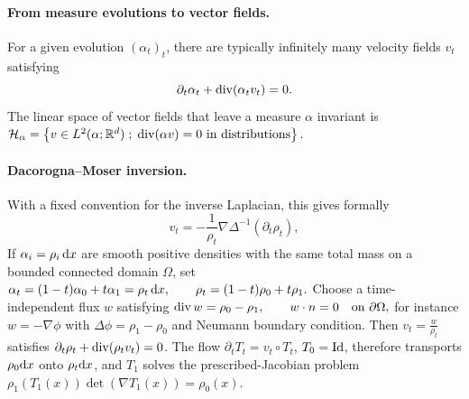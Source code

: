 \paragraph{From measure evolutions to vector fields.}
For a given evolution $(\alpha_t)_t$, there are typically infinitely many velocity fields $v_t$ satisfying
\begin{equation}\label{eq:inverse-flow}
\partial_t\alpha_t+\operatorname{div}(\alpha_t v_t)=0.
\end{equation}
The linear space of vector fields that leave a measure $\alpha$ invariant is \(\mathcal{H}_\alpha=\left\{ v\in L^2(\alpha;\mathbb{R}^d) \;;\; \operatorname{div}(\alpha v)=0\ \text{in distributions} \right\}.\)
\paragraph{Dacorogna--Moser inversion.}
With a fixed convention for the inverse Laplacian, this gives formally
\begin{equation}\label{eq:dacorogna-moser}
v_t=-\frac{1}{\rho_t}\nabla\Delta^{-1}(\partial_t\rho_t),
\end{equation}
If $\alpha_i=\rho_i\,\mathrm{d} x$ are smooth positive densities with the same total mass on a bounded connected domain $\Omega$, set
\(\alpha_t=(1-t)\alpha_0+t\alpha_1=\rho_t\,\mathrm{d} x, \qquad \rho_t=(1-t)\rho_0+t\rho_1.\)
Choose a time-independent flux $w$ satisfying
\(\operatorname{div} w=\rho_0-\rho_1, \qquad w\cdot n=0\quad\hbox{on }\partial\Omega,\)
for instance $w=-\nabla\phi$ with $\Delta\phi=\rho_1-\rho_0$ and Neumann boundary condition. Then
\(v_t=\frac{w}{\rho_t}\)
satisfies $\partial_t\rho_t+\operatorname{div}(\rho_t v_t)=0$. The flow $\partial_t T_t=v_t\circ T_t$, $T_0=\mathrm{Id}$, therefore transports $\rho_0\mathrm{d} x$ onto $\rho_t\mathrm{d} x$, and $T_1$ solves the prescribed-Jacobian problem $\rho_1(T_1(x))\det(\nabla T_1(x))=\rho_0(x)$.

